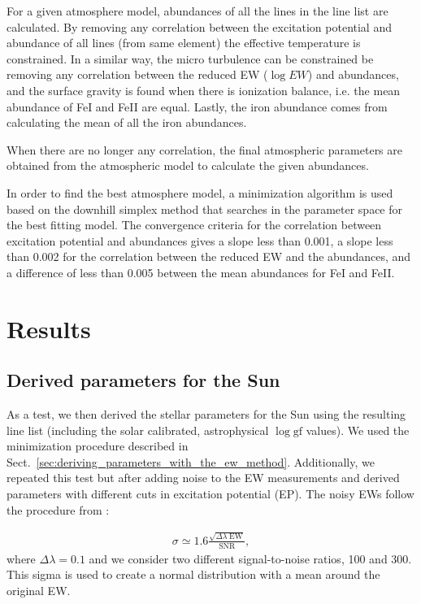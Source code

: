 \documentclass{aa}
\begin{document}
For a given atmosphere model, abundances of all the lines in the line
list are calculated. By removing any correlation between the excitation
potential and abundance of all lines (from same element) the effective
temperature is constrained. In a similar way, the micro turbulence can
be constrained be removing any correlation between the reduced EW ($\log
EW$) and abundances, and the surface gravity is found when there is
ionization balance, i.e. the mean abundance of FeI and FeII are equal.
Lastly, the iron abundance comes from calculating the mean of
all the iron abundances.

When there are no longer any correlation, the final atmospheric
parameters are obtained from the atmospheric model to calculate the
given abundances.

In order to find the best atmosphere model, a minimization algorithm
is used based on the downhill simplex method \citep{Press1992} that
searches in the parameter space for the best fitting model. The
convergence criteria for the correlation between excitation potential
and abundances gives a slope less than 0.001, a slope less than 0.002
for the correlation between the reduced EW and the abundances, and a
difference of less than 0.005 between the mean abundances for FeI and
FeII.







\section{Results}
\label{sec:results}


\subsection{Derived parameters for the Sun}
\label{sec:derived_parameters_of_the_sun}

As a test, we then derived the stellar parameters for the Sun using the
resulting line list (including the solar calibrated, astrophysical $\log
\mathrm{gf}$ values). We used the minimization procedure described in
Sect.~\ref{sec:deriving_parameters_with_the_ew_method}. Additionally,
we repeated this test but after adding noise to the EW measurements and
derived parameters with different cuts in excitation potential (EP). The
noisy EWs follow the procedure from \cite{Caryel1988}:

\begin{align}
    \sigma \simeq 1.6 \frac{\sqrt{\Delta\lambda\; \mathrm{EW}}}{\mathrm{SNR}},
\end{align}
where $\Delta\lambda=0.1$ and we consider two different signal-to-noise
ratios, 100 and 300. This sigma is used to create a normal distribution
with a mean around the original EW.
\end{document}
